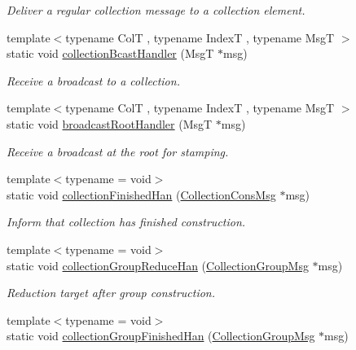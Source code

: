 \begin{DoxyCompactItemize}
\begin{DoxyCompactList}\small\item\em Deliver a regular collection message to a collection element. \end{DoxyCompactList}\item 
{\footnotesize template$<$typename ColT , typename IndexT , typename MsgT $>$ }\\static void \hyperlink{structvt_1_1vrt_1_1collection_1_1_collection_manager_a2a9fcbafc83d78d80c8d5f758e880b47}{collection\+Bcast\+Handler} (MsgT $\ast$msg)
\begin{DoxyCompactList}\small\item\em Receive a broadcast to a collection. \end{DoxyCompactList}\item 
{\footnotesize template$<$typename ColT , typename IndexT , typename MsgT $>$ }\\static void \hyperlink{structvt_1_1vrt_1_1collection_1_1_collection_manager_a9859d8346c9aac1fb0b65e6db82969db}{broadcast\+Root\+Handler} (MsgT $\ast$msg)
\begin{DoxyCompactList}\small\item\em Receive a broadcast at the root for stamping. \end{DoxyCompactList}\item 
{\footnotesize template$<$typename  = void$>$ }\\static void \hyperlink{structvt_1_1vrt_1_1collection_1_1_collection_manager_ad56b5d61a3f1a8286e21076a274dcf17}{collection\+Finished\+Han} (\hyperlink{structvt_1_1vrt_1_1collection_1_1_collection_cons_msg}{Collection\+Cons\+Msg} $\ast$msg)
\begin{DoxyCompactList}\small\item\em Inform that collection has finished construction. \end{DoxyCompactList}\item 
{\footnotesize template$<$typename  = void$>$ }\\static void \hyperlink{structvt_1_1vrt_1_1collection_1_1_collection_manager_acf097bb149749c5e8e93d31b84d5a2a3}{collection\+Group\+Reduce\+Han} (\hyperlink{structvt_1_1vrt_1_1collection_1_1_collection_group_msg}{Collection\+Group\+Msg} $\ast$msg)
\begin{DoxyCompactList}\small\item\em Reduction target after group construction. \end{DoxyCompactList}\item 
{\footnotesize template$<$typename  = void$>$ }\\static void \hyperlink{structvt_1_1vrt_1_1collection_1_1_collection_manager_abf80612ba1db9aadf590f837ae4ca7a7}{collection\+Group\+Finished\+Han} (\hyperlink{structvt_1_1vrt_1_1collection_1_1_collection_group_msg}{Collection\+Group\+Msg} $\ast$msg)

\end{DoxyCompactItemize}
